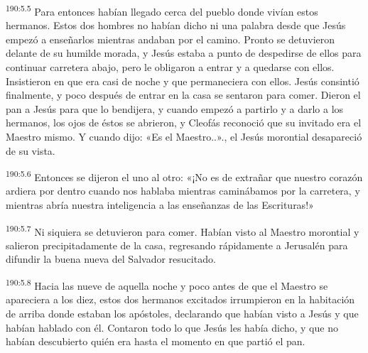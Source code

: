 \par 
\textsuperscript{190:5.5} Para entonces habían llegado cerca del pueblo donde vivían estos hermanos. Estos dos hombres no habían dicho ni una palabra desde que Jesús empezó a enseñarlos mientras andaban por el camino. Pronto se detuvieron delante de su humilde morada, y Jesús estaba a punto de despedirse de ellos para continuar carretera abajo, pero le obligaron a entrar y a quedarse con ellos. Insistieron en que era casi de noche y que permaneciera con ellos. Jesús consintió finalmente, y poco después de entrar en la casa se sentaron para comer. Dieron el pan a Jesús para que lo bendijera, y cuando empezó a partirlo y a darlo a los hermanos, los ojos de éstos se abrieron, y Cleofás reconoció que su invitado era el Maestro mismo. Y cuando dijo: «Es el Maestro..»., el Jesús morontial desapareció de su vista.

\par 
\textsuperscript{190:5.6} Entonces se dijeron el uno al otro: «¡No es de extrañar que nuestro corazón ardiera por dentro cuando nos hablaba mientras caminábamos por la carretera, y mientras abría nuestra inteligencia a las enseñanzas de las Escrituras!»

\par 
\textsuperscript{190:5.7} Ni siquiera se detuvieron para comer. Habían visto al Maestro morontial y salieron precipitadamente de la casa, regresando rápidamente a Jerusalén para difundir la buena nueva del Salvador resucitado.

\par 
\textsuperscript{190:5.8} Hacia las nueve de aquella noche y poco antes de que el Maestro se apareciera a los diez, estos dos hermanos excitados irrumpieron en la habitación de arriba donde estaban los apóstoles, declarando que habían visto a Jesús y que habían hablado con él. Contaron todo lo que Jesús les había dicho, y que no habían descubierto quién era hasta el momento en que partió el pan.